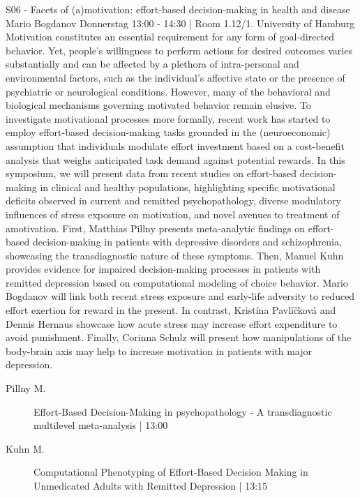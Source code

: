 
            \begin{symposium}
            {S06 - Facets of (a)motivation: effort-based decision-making in health and disease }
            {Mario Bogdanov}
            {Donnerstag 13:00 - 14:30 | Room 1.12/1.}
            {University of Hamburg}
            Motivation constitutes an essential requirement for any form of goal-directed behavior. Yet, people’s willingness to perform actions for desired outcomes varies substantially and can be affected by a plethora of intra-personal and environmental factors, such as the individual’s affective state or the presence of psychiatric or neurological conditions. However, many of the behavioral and biological mechanisms governing motivated behavior remain elusive. To investigate motivational processes more formally, recent work has started to employ effort-based decision-making tasks grounded in the (neuroeconomic) assumption that individuals modulate effort investment based on a cost-benefit analysis that weighs anticipated task demand against potential rewards. In this symposium, we will present data from recent studies on effort-based decision-making in clinical and healthy populations, highlighting specific motivational deficits observed in current and remitted psychopathology, diverse modulatory influences of stress exposure on motivation, and novel avenues to treatment of amotivation. First, Matthias Pillny presents meta-analytic findings on effort-based decision-making in patients with depressive disorders and schizophrenia, showcasing the transdiagnostic nature of these symptoms. Then, Manuel Kuhn provides evidence for impaired decision-making processes in patients with remitted depression based on computational modeling of choice behavior. Mario Bogdanov will link both recent stress exposure and early-life adversity to reduced effort exertion for reward in the present. In contrast, Kristína Pavlíčková and Dennis Hernaus showcase how acute stress may increase effort expenditure to avoid punishment. Finally, Corinna Schulz will present how manipulations of the body-brain axis may help to increase motivation in patients with major depression.
            \begin{description}    
            
                \item [ Pillny M.] Effort-Based Decision-Making in psychopathology - A transdiagnostic multilevel meta-analysis \textcolor{mygray}{ | 13:00}    
                
                \item [ Kuhn M.] Computational Phenotyping of Effort-Based Decision Making in Unmedicated Adults with Remitted Depression \textcolor{mygray}{ | 13:15}    
                

\end{description}
\end{symposium}
